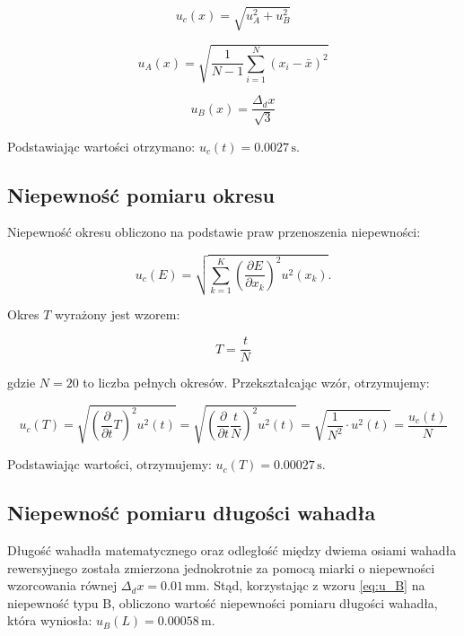 \documentclass[a4paper,12pt]{article}
\begin{document}
\begin{equation}
  \label{eq:u_c}
  u_c(x) = \sqrt{u_A^2 + u_B^2}
\end{equation}

\begin{equation}
  \label{eq:u_A}
  u_A(x) = \sqrt{\frac{1}{N-1} \sum_{i=1}^{N} (x_i - \bar{x})^2}
\end{equation}

\begin{equation}
  \label{eq:u_B}
  u_B(x) = \frac{\Delta_d x}{\sqrt{3}}
\end{equation}



Podstawiając wartości otrzymano: $u_c(t) = 0.0027\,\text{s}$.

\subsection{Niepewność pomiaru okresu}

Niepewność okresu obliczono na podstawie praw przenoszenia niepewności:

\begin{equation}
  \label{eq:niepewnosc_zlozona}
  u_c(E) = \sqrt{\sum_{k=1}^{K} \left( \frac{\partial E}{\partial x_k} \right)^2 u^2(x_k)}.
\end{equation}

Okres $T$ wyrażony jest wzorem:

\[
  T = \frac{t}{N}
\]

gdzie $N=20$ to liczba pełnych okresów. Przekształcając wzór, otrzymujemy:

\[
  u_c(T) = \sqrt{\left(\frac{\partial}{\partial t} T\right)^2 u^2(t)} = \sqrt{\left(\frac{\partial}{\partial t} \frac{t}{N}\right)^2 u^2(t)} = \sqrt{ \frac{1}{N^2} \cdot u^2(t)} = \frac{u_c(t)}{N}
\]

Podstawiając wartości, otrzymujemy: $u_c(T) = 0.00027\,\text{s}$.

\subsection{Niepewność pomiaru długości wahadła}

Długość wahadła matematycznego oraz odległość między dwiema osiami wahadła rewersyjnego została zmierzona jednokrotnie za pomocą miarki o niepewności wzorcowania równej $\Delta_d x = 0.01\,\text{mm}$. Stąd, korzystając z wzoru \ref{eq:u_B} na niepewność typu B, obliczono wartość niepewności pomiaru długości wahadła, która wyniosła: $u_B(L) = 0.00058\,\text{m}$.
\end{document}
